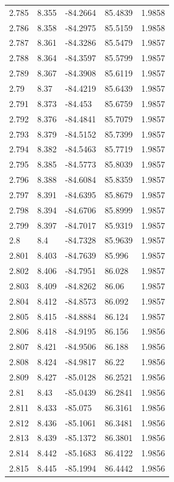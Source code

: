 \begin{tabular}{lllll}
2.785 & 8.355 & -84.2664 & 85.4839 & 1.9858 \\
2.786 & 8.358 & -84.2975 & 85.5159 & 1.9858 \\
2.787 & 8.361 & -84.3286 & 85.5479 & 1.9857 \\
2.788 & 8.364 & -84.3597 & 85.5799 & 1.9857 \\
2.789 & 8.367 & -84.3908 & 85.6119 & 1.9857 \\
2.79 & 8.37 & -84.4219 & 85.6439 & 1.9857 \\
2.791 & 8.373 & -84.453 & 85.6759 & 1.9857 \\
2.792 & 8.376 & -84.4841 & 85.7079 & 1.9857 \\
2.793 & 8.379 & -84.5152 & 85.7399 & 1.9857 \\
2.794 & 8.382 & -84.5463 & 85.7719 & 1.9857 \\
2.795 & 8.385 & -84.5773 & 85.8039 & 1.9857 \\
2.796 & 8.388 & -84.6084 & 85.8359 & 1.9857 \\
2.797 & 8.391 & -84.6395 & 85.8679 & 1.9857 \\
2.798 & 8.394 & -84.6706 & 85.8999 & 1.9857 \\
2.799 & 8.397 & -84.7017 & 85.9319 & 1.9857 \\
2.8 & 8.4 & -84.7328 & 85.9639 & 1.9857 \\
2.801 & 8.403 & -84.7639 & 85.996 & 1.9857 \\
2.802 & 8.406 & -84.7951 & 86.028 & 1.9857 \\
2.803 & 8.409 & -84.8262 & 86.06 & 1.9857 \\
2.804 & 8.412 & -84.8573 & 86.092 & 1.9857 \\
2.805 & 8.415 & -84.8884 & 86.124 & 1.9857 \\
2.806 & 8.418 & -84.9195 & 86.156 & 1.9856 \\
2.807 & 8.421 & -84.9506 & 86.188 & 1.9856 \\
2.808 & 8.424 & -84.9817 & 86.22 & 1.9856 \\
2.809 & 8.427 & -85.0128 & 86.2521 & 1.9856 \\
2.81 & 8.43 & -85.0439 & 86.2841 & 1.9856 \\
2.811 & 8.433 & -85.075 & 86.3161 & 1.9856 \\
2.812 & 8.436 & -85.1061 & 86.3481 & 1.9856 \\
2.813 & 8.439 & -85.1372 & 86.3801 & 1.9856 \\
2.814 & 8.442 & -85.1683 & 86.4122 & 1.9856 \\
2.815 & 8.445 & -85.1994 & 86.4442 & 1.9856 \\

\end{tabular}
